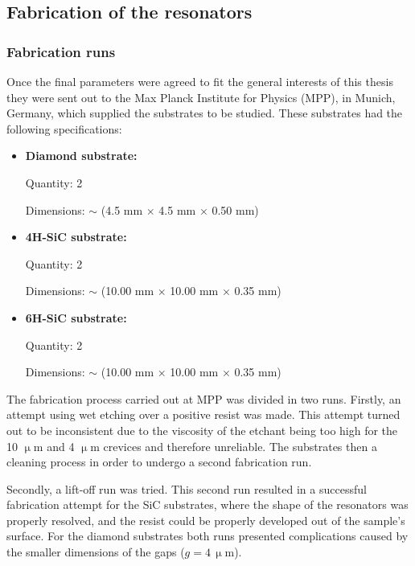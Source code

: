 \documentclass[12pt, a4paper]{article}
\begin{document}
\subsection{Fabrication of the resonators}

\subsubsection{Fabrication runs}

Once the final parameters were agreed to fit the general interests of this thesis they were sent out to the Max Planck Institute for Physics (MPP), in Munich, Germany, which supplied the substrates to be studied. These substrates had the following specifications:

\begin{itemize}
    \item \textbf{Diamond substrate:} 
    
    Quantity: 2

    Dimensions: $\sim$ (4.5 mm $\times$ 4.5 mm $\times$ 0.50 mm)

    \item \textbf{4H-SiC substrate:}
    
    Quantity: 2

    Dimensions: $\sim$ (10.00 mm $\times$ 10.00 mm $\times$ 0.35 mm)

    \item \textbf{6H-SiC substrate:}
    
    Quantity: 2

    Dimensions: $\sim$ (10.00 mm $\times$ 10.00 mm $\times$ 0.35 mm)

\end{itemize}

The fabrication process carried out at MPP was divided in two runs. Firstly, an attempt using wet etching over a positive resist was made. This attempt turned out to be inconsistent due to the viscosity of the etchant being too high for the 10 $\upmu$m and 4 $\upmu$m crevices and therefore unreliable. The substrates then a cleaning process in order to undergo a second fabrication run. 

Secondly, a lift-off run was tried. This second run resulted in a successful fabrication attempt for the SiC substrates, where the shape of the resonators was properly resolved, and the resist could be properly developed out of the sample's surface. For the diamond substrates both runs presented complications caused by the smaller dimensions of the gaps ($g = 4 \, \upmu \text{m}$).
\end{document}
